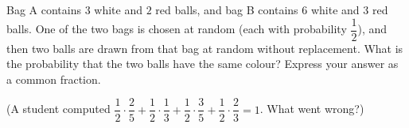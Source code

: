 Bag A contains $3$ white and $2$ red balls, and bag B contains $6$ white and $3$ red balls. One of the two bags is chosen at random (each with probability $\dfrac{1}{2}$), and then two balls are drawn from that bag at random without replacement. What is the probability that the two balls have the same colour? Express your answer as a common fraction.

(A student computed $\dfrac{1}{2}\cdot\dfrac{2}{5}+\dfrac{1}{2}\cdot\dfrac{1}{3}+\dfrac{1}{2}\cdot\dfrac{3}{5}+\dfrac{1}{2}\cdot\dfrac{2}{3}=1$. What went wrong?)
